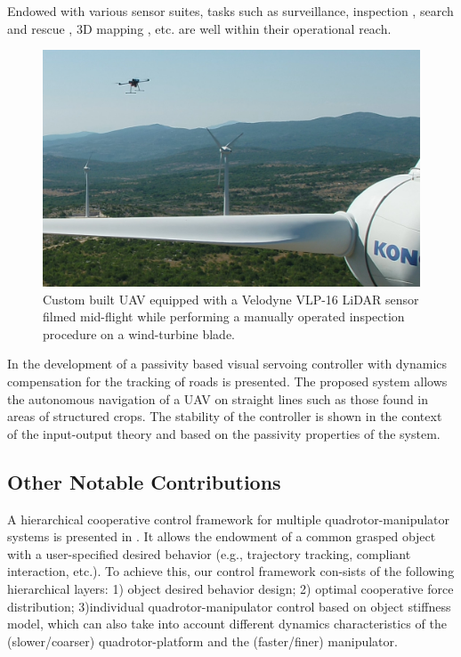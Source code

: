 Endowed with various sensor suites, tasks such as surveillance, inspection \cite{ref:corosion-inspection}\cite{ref:inspection-overview}\cite{Ollero2018}, search and rescue \cite{ref:sar}, 3D mapping \cite{ref:lidar-equipped-model-building}, etc. are well within their operational reach.

\begin{figure}[H]
	\centering
	\includegraphics[width=\columnwidth]{./figure/drone_flight3_1.png}
	\caption{Custom built UAV equipped with a Velodyne VLP-16 LiDAR sensor filmed mid-flight  while performing a manually operated inspection procedure on a wind-turbine blade.}
	\label{fig:drone-flight}
\end{figure}

In \cite{passivity-based-crop} the development of a passivity based visual servoing controller with dynamics compensation for the tracking of roads is presented. The proposed system allows the autonomous navigation of a UAV on straight lines such as those found in areas of structured crops. The stability of the controller is shown in the context of the input-output theory and based on the passivity properties of the system.

\subsection{Other Notable Contributions}
A hierarchical cooperative control framework for multiple quadrotor-manipulator systems is presented in \cite{cooperative-control-quadrotor}. It allows the endowment of a common grasped object with a user-specified desired behavior (e.g., trajectory tracking, compliant interaction, etc.). To achieve  this,  our  control  framework  con-sists  of  the  following  hierarchical  layers: 1) object desired behavior design; 2) optimal cooperative force distribution; 3)individual quadrotor-manipulator control based on object stiffness model, which can also take into account different dynamics characteristics of the (slower/coarser) quadrotor-platform and the (faster/finer) manipulator.

